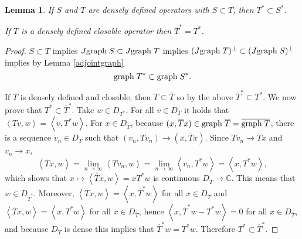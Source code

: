 \documentclass{article}
\newcommand{\inner}[2]{\left\langle #1, #2 \right\rangle}
\newcommand{\graph}{\ensuremath\mathrm{graph}\;}
\newtheorem{lemma}[theorem]{Lemma}
\theoremstyle{definition}
\begin{document}
\begin{lemma}
If $S$ and $T$ are densely defined operators with $S \subset T$, then
$T^* \subset S^*$.

If $T$ is a densely defined closable operator then $\overline{T}^* = T^*$.
\end{lemma}
\begin{proof}
$S \subset T$ implies $J \graph S \subset J \graph T$ implies $(J \graph T)^\perp \subset (J \graph S)^\perp$ implies by
Lemma \ref{adjointgraph}
\[
\graph T^* \subset \graph S^*.
\]

If $T$ is densely defined and closable, then $T \subset \overline{T}$ so
by the above $\overline{T}^* \subset T^*$. 
We now prove that $T^* \subset \overline{T}^*$.
Take
$w \in D_{T^*}$. For all $v \in D_T$ it holds that $\inner{Tv}{w}=\inner{v}{T^*w}$. 
For $x \in D_{\overline{T}}$, because $(x,\overline{T}x) \in \graph \overline{T}
=\overline{\graph T}$,  there is a sequence
$v_n \in D_T$ such that $(v_n,Tv_n) \to (x,\overline{T}x)$. 
Since $Tv_n \to \overline{T}x$ and $v_n \to x$,
\[
\inner{\overline{T}x}{w} = \lim_{n \to \infty} \inner{Tv_n}{w}
=\lim_{n \to \infty} \inner{v_n}{T^*w}
=\inner{x}{T^*w},
\]
which shows that $x \mapsto \inner{\overline{T}x}{w} = \overline{x}{T^*w}$ is continuous
$D_{\overline{T}} \to \mathbb{C}$. This means that $w \in D_{\overline{T}^*}$. 
Moreover, $\inner{\overline{T}x}{w} = \inner{x}{\overline{T}^*w}$ for all
$x \in D_{\overline{T}}$ and 
$\inner{\overline{T}x}{w} = \inner{x}{T^*w}$ for all $x \in D_{\overline{T}}$, hence
$\inner{x}{\overline{T}^*w-T^*w}=0$ for all $x \in D_{\overline{T}}$, and because
$D_{\overline{T}}$ is dense this implies that $\overline{T}^*w = T^*w$. Therefore
$T^* \subset \overline{T}^*$. 
\end{proof}
\end{document}
